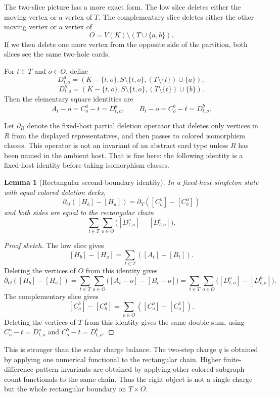 \documentclass[11pt]{article}
\newtheorem{lemma}{Lemma}
\begin{document}
The two-slice picture has a more exact form.  The low slice deletes either
the moving vertex or a vertex of \(T\).  The complementary slice deletes
either the other moving vertex or a vertex of
\[
  O=V(K)\setminus(T\cup\{a,b\}).
\]
If we then delete one more vertex from the opposite side of the partition,
both slices see the same two-hole cards.

For \(t\in T\) and \(o\in O\), define
\[
  D_{t,o}^a
  =
  (K-\{t,o\},S\setminus\{t,o\},(T\setminus\{t\})\cup\{a\}),
\]
\[
  D_{t,o}^b
  =
  (K-\{t,o\},S\setminus\{t,o\},(T\setminus\{t\})\cup\{b\}).
\]
Then the elementary square identities are
\[
  A_t-o=C_o^a-t=D_{t,o}^a,
  \qquad
  B_t-o=C_o^b-t=D_{t,o}^b.
\]

Let \(\partial_R\) denote the fixed-host partial deletion operator that
deletes only vertices in \(R\) from the displayed representatives, and then
passes to colored isomorphism classes.  This operator is not an invariant of
an abstract card type unless \(R\) has been named in the ambient host.  That
is fine here: the following identity is a fixed-host identity before taking
isomorphism classes.

\begin{lemma}[Rectangular second-boundary identity]
In a fixed-host singleton state with equal colored deletion decks,
\[
  \partial_O([H_b]-[H_a])
  =
  \partial_T([C_a^b]-[C_b^a])
\]
and both sides are equal to the rectangular chain
\[
  \sum_{t\in T}\sum_{o\in O}
    \bigl([D_{t,o}^a]-[D_{t,o}^b]\bigr).
\]
\end{lemma}

\begin{proof}[Proof sketch]
The low slice gives
\[
  [H_b]-[H_a]=\sum_{t\in T}([A_t]-[B_t]).
\]
Deleting the vertices of \(O\) from this identity gives
\[
  \partial_O([H_b]-[H_a])
  =
  \sum_{t\in T}\sum_{o\in O}
    \bigl([A_t-o]-[B_t-o]\bigr)
  =
  \sum_{t\in T}\sum_{o\in O}
    \bigl([D_{t,o}^a]-[D_{t,o}^b]\bigr).
\]
The complementary slice gives
\[
  [C_a^b]-[C_b^a]=\sum_{o\in O}([C_o^a]-[C_o^b]).
\]
Deleting the vertices of \(T\) from this identity gives the same double sum,
using \(C_o^a-t=D_{t,o}^a\) and \(C_o^b-t=D_{t,o}^b\).
\end{proof}

This is stronger than the scalar charge balance.  The two-step charge \(q\)
is obtained by applying one numerical functional to the rectangular chain.
Higher finite-difference pattern invariants are obtained by applying other
colored subgraph-count functionals to the same chain.  Thus the right object
is not a single charge but the whole rectangular boundary on \(T\times O\).
\end{document}
